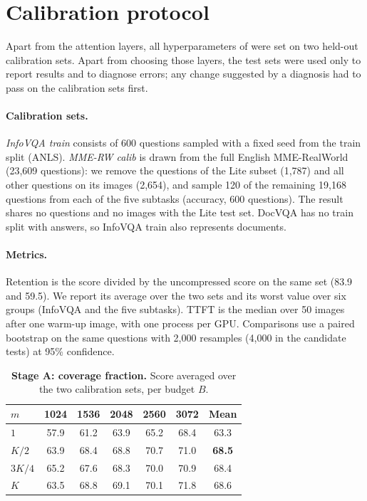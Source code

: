 \section{Calibration protocol}
\label{sec:calibration}

Apart from the attention layers, all hyperparameters of \method were set on two held-out calibration sets. Apart from choosing those layers, the test sets were used only to report results and to diagnose errors; any change suggested by a diagnosis had to pass on the calibration sets first.

\paragraph{Calibration sets.}
\emph{InfoVQA train} consists of 600 questions sampled with a fixed seed from the train split (ANLS).
\emph{MME-RW calib} is drawn from the full English MME-RealWorld (23,609 questions): we remove the questions of
the Lite subset (1,787) and all other questions on its images (2,654), and sample 120 of the remaining 19,168
questions from each of the five subtasks (accuracy, 600 questions). The result shares no questions and no images with the Lite test set.
DocVQA has no train split with answers, so InfoVQA train also represents documents.

\paragraph{Metrics.}
Retention is the score divided by the uncompressed score on the same set (83.9 and 59.5). We report its average
over the two sets and its worst value over six groups (InfoVQA and the five subtasks). TTFT is the median over 50
images after one warm-up image, with one process per GPU. Comparisons use a paired bootstrap on the same questions
with 2,000 resamples (4,000 in the candidate tests) at 95\% confidence.

\begin{table}[t]
  \centering
  \footnotesize
  \setlength{\tabcolsep}{4pt}
  \begin{tabular}{l ccccc c}
    \toprule
    $m$ & 1024 & 1536 & 2048 & 2560 & 3072 & Mean \\
    \midrule
    $1$ & 57.9 & 61.2 & 63.9 & 65.2 & 68.4 & 63.3 \\
    $K/2$ & 63.9 & 68.4 & 68.8 & 70.7 & 71.0 & \textbf{68.5} \\
    $3K/4$ & 65.2 & 67.6 & 68.3 & 70.0 & 70.9 & 68.4 \\
    $K$ & 63.5 & 68.8 & 69.1 & 70.1 & 71.8 & 68.6 \\
    \bottomrule
  \end{tabular}
  \caption{\textbf{Stage A: coverage fraction.} Score averaged over the two calibration sets, per budget $B$.}
  \label{tab:calib_m}
\end{table}

